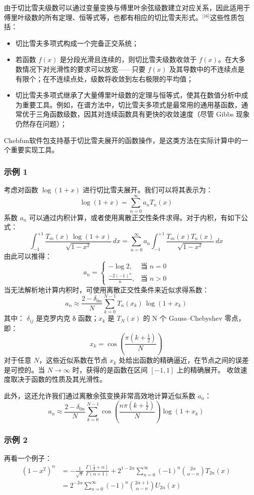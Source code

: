 由于切比雪夫级数可以通过变量变换与傅里叶余弦级数建立对应关系，因此适用于傅里叶级数的所有定理、恒等式等，也都有相应的切比雪夫形式。\(^\text{[16]}\)这些性质包括：
\begin{itemize}
\item 切比雪夫多项式构成一个完备正交系统；
\item 若函数 $f(x)$ 是分段光滑且连续的，则切比雪夫级数收敛于 $f(x)$。在大多数情况下对光滑性的要求可以放宽——只要 $f(x)$ 及其导数中的不连续点是有限个；在不连续点处，级数将收敛到左右极限的平均值；
\item 切比雪夫多项式继承了大量傅里叶级数的定理与恒等式，使其在数值分析中成为重要工具。例如，在谱方法中，切比雪夫多项式是最常用的通用基函数，通常优于三角函数级数，因其对连续函数具有更快的收敛速度（尽管 Gibbs 现象仍然存在问题）；
\end{itemize}
Chebfun软件包支持基于切比雪夫展开的函数操作，是这类方法在实际计算中的一个重要实现工具。
\subsubsection{示例 1}
考虑对函数 $\log(1 + x)$ 进行切比雪夫展开。我们可以将其表示为：
$$
\log(1 + x) = \sum_{n=0}^{\infty} a_n T_n(x)~
$$
系数 $a_n$ 可以通过内积计算，或者使用离散正交性条件求得。对于内积，有如下公式：
$$
\int_{-1}^{+1} \frac{T_m(x)\, \log(1+x)}{\sqrt{1 - x^2}}\, dx = \sum_{n=0}^{\infty} a_n \int_{-1}^{+1} \frac{T_m(x) T_n(x)}{\sqrt{1 - x^2}}\, dx~
$$
由此可以推得：
$$
a_n =
\begin{cases}
- \log 2, & \text{当 } n = 0 \\
\displaystyle \frac{-2 (-1)^n}{n}, & \text{当 } n > 0
\end{cases}~
$$
当无法解析地计算内积时，可使用离散正交性条件来近似求得系数：
$$
a_n \approx \frac{2 - \delta_{0n}}{N} \sum_{k=0}^{N-1} T_n(x_k)\, \log(1 + x_k)~
$$
其中： $\delta_{ij}$ 是克罗内克 δ 函数；$x_k$ 是 $T_N(x)$ 的 N 个 Gauss–Chebyshev 零点，即：
$$
x_k = \cos\left( \frac{\pi(k + \tfrac{1}{2})}{N} \right)~
$$
对于任意 $N$，这些近似系数在节点 $x_k$ 处给出函数的精确逼近，在节点之间的误差是可控的。当 $N \to \infty$ 时，获得的是函数在区间 $[-1,1]$ 上的精确展开。
收敛速度取决于函数的性质及其光滑性。

此外，这还允许我们通过离散余弦变换非常高效地计算近似系数 $a_n$：
$$
a_n \approx \frac{2 - \delta_{0n}}{N} \sum_{k=0}^{N-1} \cos\left( \frac{n\pi(k + \tfrac{1}{2})}{N} \right) \log(1 + x_k)~
$$
\subsubsection{示例 2}
再看一个例子：
$$
\begin{aligned}
(1 - x^2)^{\alpha} &= -\frac{1}{\sqrt{\pi}}\,\frac{\Gamma\left(\tfrac{1}{2} + \alpha\right)}{\Gamma(\alpha + 1)} + 2^{1 - 2\alpha} \sum_{n=0}^{\infty} (-1)^n \binom{2\alpha}{\alpha - n} T_{2n}(x)\\
&= 2^{-2\alpha} \sum_{n=0}^{\infty} (-1)^n \binom{2\alpha + 1}{\alpha - n} U_{2n}(x)
\end{aligned}~
$$
